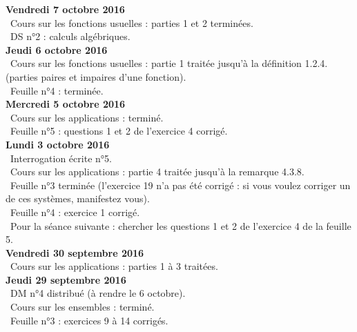 \documentclass[12pt,a4paper]{article}
\begin{document}
\noindent\textbf{Vendredi 7 octobre 2016}\\
\bu\ Cours sur les fonctions usuelles : parties 1 et 2 terminées.  \\
\bu\ DS n°2 : calculs algébriques.\vspace{.4cm}\\

\noindent\textbf{Jeudi 6 octobre 2016}\\
\bu\ Cours sur les fonctions usuelles : partie 1 traitée jusqu'à la définition 1.2.4. (parties paires et impaires d'une fonction).  \\
\bu\ Feuille n°4 : terminée. \vspace{.4cm}\\

\noindent\textbf{Mercredi 5 octobre 2016}\\
\bu\ Cours sur les applications : terminé. \\
\bu\ Feuille n°5 : questions 1 et 2 de l'exercice 4 corrigé. \vspace{.4cm}\\

\noindent\textbf{Lundi 3 octobre 2016}\\
\bu\ Interrogation écrite n°5. \\
\bu\ Cours sur les applications : partie 4 traitée jusqu'à la remarque 4.3.8. \\
\bu\ Feuille n°3 terminée (l'exercice 19 n'a pas été corrigé : si vous voulez corriger un de ces systèmes, manifestez vous). \\
\bu\ Feuille n°4 : exercice 1 corrigé. \\
\bu\ Pour la séance suivante : chercher les questions 1 et 2 de l'exercice 4 de la feuille 5. \vspace{.4cm}\\

\noindent\textbf{Vendredi 30 septembre 2016}\\
\bu\ Cours sur les applications : parties 1 à 3 traitées. \vspace{.4cm}\\

\noindent\textbf{Jeudi 29 septembre 2016}\\
\bu\ DM n°4 distribué (à rendre le 6 octobre).\\
\bu\ Cours sur les ensembles : terminé.\\
\bu\ Feuille n°3 : exercices 9 à 14 corrigés. \vspace{.4cm}\\
\end{document}
